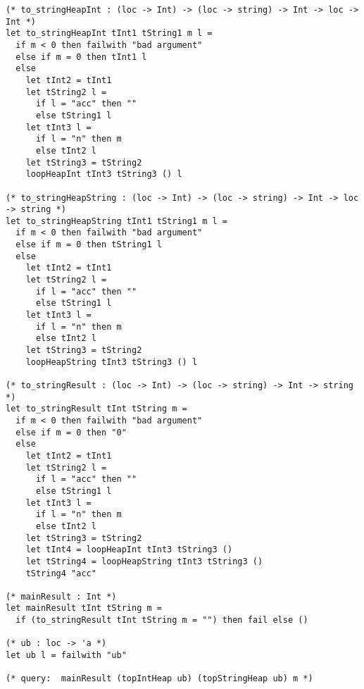 \documentclass{article}
\begin{document}
\begin{verbatim}
(* to_stringHeapInt : (loc -> Int) -> (loc -> string) -> Int -> loc -> Int *)
let to_stringHeapInt tInt1 tString1 m l =
  if m < 0 then failwith "bad argument"
  else if m = 0 then tInt1 l
  else
    let tInt2 = tInt1
    let tString2 l =
      if l = "acc" then ""
      else tString1 l
    let tInt3 l =
      if l = "n" then m
      else tInt2 l
    let tString3 = tString2
    loopHeapInt tInt3 tString3 () l

(* to_stringHeapString : (loc -> Int) -> (loc -> string) -> Int -> loc -> string *)
let to_stringHeapString tInt1 tString1 m l =
  if m < 0 then failwith "bad argument"
  else if m = 0 then tString1 l
  else
    let tInt2 = tInt1
    let tString2 l =
      if l = "acc" then ""
      else tString1 l
    let tInt3 l =
      if l = "n" then m
      else tInt2 l
    let tString3 = tString2
    loopHeapString tInt3 tString3 () l

(* to_stringResult : (loc -> Int) -> (loc -> string) -> Int -> string *)
let to_stringResult tInt tString m =
  if m < 0 then failwith "bad argument"
  else if m = 0 then "0"
  else
    let tInt2 = tInt1
    let tString2 l =
      if l = "acc" then ""
      else tString1 l
    let tInt3 l =
      if l = "n" then m
      else tInt2 l
    let tString3 = tString2
    let tInt4 = loopHeapInt tInt3 tString3 ()
    let tString4 = loopHeapString tInt3 tString3 ()
    tString4 "acc"

(* mainResult : Int *)
let mainResult tInt tString m =
  if (to_stringResult tInt tString m = "") then fail else ()

(* ub : loc -> 'a *)
let ub l = failwith "ub"

(* query:  mainResult (topIntHeap ub) (topStringHeap ub) m *)
\end{verbatim}
\end{document}
